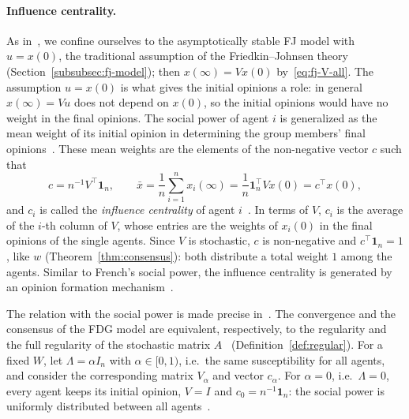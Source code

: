 \paragraph{Influence centrality.}
As in~\cite{proskurnikov2017tutorial}, we confine ourselves to the asymptotically
stable FJ model with $u = x(0)$, the traditional assumption of the Friedkin--Johnsen
theory (Section~\ref{subsubsec:fj-model}); then $x(\infty) = V x(0)$
by~\eqref{eq:fj-V-all}. The assumption $u = x(0)$ is what gives the initial
opinions a role: in general $x(\infty) = Vu$ does not depend on $x(0)$, so the initial
opinions would have no weight in the final opinions. The social power of agent $i$ is
generalized as the mean weight of its initial opinion in determining the group
members' final opinions~\cite{proskurnikov2017tutorial}. These mean weights are the
elements of the non-negative vector $c$ such that
\begin{equation}\label{eq:influence}
  c = n^{-1} V^\top \mathbf{1}_n, \qquad
  \bar x = \frac{1}{n} \sum_{i=1}^{n} x_i(\infty)
         = \frac{1}{n} \mathbf{1}_n^\top V x(0) = c^\top x(0),
\end{equation}
and $c_i$ is called the \emph{influence centrality} of agent
$i$~\cite{proskurnikov2017tutorial}. In terms of $V$, $c_i$ is the average of the
$i$-th column of $V$, whose entries are the weights of $x_i(0)$ in the final opinions
of the single agents. Since $V$ is stochastic, $c$ is non-negative and $c^\top \mathbf{1}_n = 1$, like $w$
(Theorem~\ref{thm:consensus}): both distribute a total weight $1$ among the agents.
Similar to
French's social power, the influence centrality is generated by an opinion formation
mechanism~\cite{proskurnikov2017tutorial}.

The relation with the social power is made precise in~\cite{proskurnikov2017tutorial}.
The convergence and the consensus of the FDG model are equivalent, respectively, to
the regularity and the full regularity of the stochastic matrix
$A$~\cite{proskurnikov2017tutorial} (Definition~\ref{def:regular}). For a fixed $W$,
let $\Lambda = \alpha I_n$ with $\alpha \in [0,1)$, i.e.\ the same susceptibility for
all agents, and consider the corresponding matrix $V_\alpha$ and vector $c_\alpha$.
For $\alpha = 0$, i.e.\ $\Lambda = 0$, every agent keeps its initial opinion, $V = I$
and $c_0 = n^{-1} \mathbf{1}_n$: the social power is uniformly distributed between all
agents~\cite{proskurnikov2017tutorial}.

